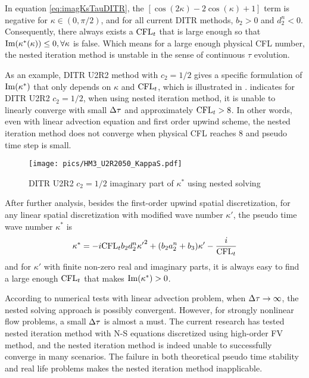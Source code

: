 In equation \eqref{eq:imagKsTauDITR},
the $\left[\cos(2\kappa) -2\cos(\kappa) + 1\right]$ term
is negative for $\kappa \in (0, \pi/2)$, and for
all current DITR methods, $b_2>0$ and $d_2^n < 0$.
Consequently, there always exists a $\text{CFL}_t$ that is large enough
so that $\mathrm{Im}(\kappa^*(\kappa)) \leq 0, \forall \kappa$ is false.
Which means for a large enough physical CFL number, the nested
iteration method is unstable in the sense of continuous $\tau$
evolution.

As an example, DITR U2R2 method with $c_2=1/2$ gives
a specific formulation of $\mathrm{Im}(\kappa^*)$ that only depends on $\kappa$
and $\text{CFL}_t$, which is illustrated in .
 indicates for DITR U2R2 $c_2=1/2$,
when using nested iteration method, it is unable to linearly converge
with small ${\Delta} \tau$ and approximately $\text{CFL}_t > 8$.
In other words, even with linear advection equation and first order upwind
scheme,
the nested iteration method does not converge when physical CFL reaches 8
and pseudo time step is small.

\begin{figure}[htbp]
    \centering
    \texttt{[image: pics/HM3\_U2R2050\_KappaS.pdf]}
    \caption[]{DITR U2R2 $c_2=1/2$ imaginary part of $\kappa^*$ using
        nested solving}
    \label{fig:HM3_U2R2050_KappaS}
\end{figure}

After further analysis,
besides the first-order upwind spatial discretization,
for any linear spatial discretization with modified wave number $\kappa'$,
the pseudo time wave number $\kappa^*$ is
\begin{equation}
    \begin{aligned}
        \kappa^* =
        -i\text{CFL}_t b_2 d_2^n {\kappa'}^2
        + (b_2a_2^n + b_3) \kappa' - \frac{i}{\text{CFL}_t}
    \end{aligned}
    \label{eq:imagKsTauDITR_General}
\end{equation}
and for $\kappa'$ with finite non-zero real and imaginary parts,
it is always easy to find a large enough $\text{CFL}_t$ that makes
$\mathrm{Im}(\kappa^*) > 0$.


According to numerical tests with linear advection problem,
when ${\Delta} \tau \rightarrow \infty$, the nested solving
approach is possibly convergent. However, for strongly nonlinear
flow problems, a small ${\Delta} \tau$ is almost a must.
The current research has tested nested iteration method
with N-S equations discretized using high-order FV method,
and the nested iteration method is indeed unable to successfully
converge in many scenarios.
The failure in both theoretical pseudo time stability and
real life problems makes
the nested iteration method inapplicable.

